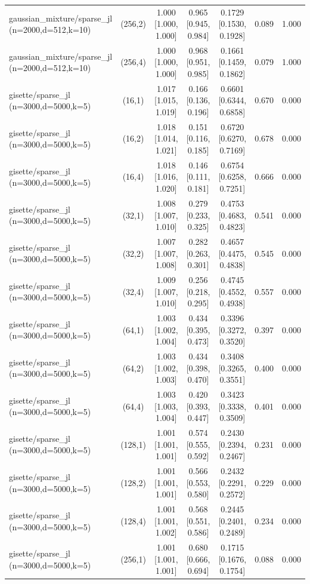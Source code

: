 \begin{tabular}{lcccccc}
gaussian\_mixture/sparse\_jl (n=2000,d=512,k=10) & (256,2) & 1.000 [1.000, 1.000] & 0.965 [0.945, 0.984] & 0.1729 [0.1530, 0.1928] & 0.089 & 1.000 \\
gaussian\_mixture/sparse\_jl (n=2000,d=512,k=10) & (256,4) & 1.000 [1.000, 1.000] & 0.968 [0.951, 0.985] & 0.1661 [0.1459, 0.1862] & 0.079 & 1.000 \\
gisette/sparse\_jl (n=3000,d=5000,k=5) & (16,1) & 1.017 [1.015, 1.019] & 0.166 [0.136, 0.196] & 0.6601 [0.6344, 0.6858] & 0.670 & 0.000 \\
gisette/sparse\_jl (n=3000,d=5000,k=5) & (16,2) & 1.018 [1.014, 1.021] & 0.151 [0.116, 0.185] & 0.6720 [0.6270, 0.7169] & 0.678 & 0.000 \\
gisette/sparse\_jl (n=3000,d=5000,k=5) & (16,4) & 1.018 [1.016, 1.020] & 0.146 [0.111, 0.181] & 0.6754 [0.6258, 0.7251] & 0.666 & 0.000 \\
gisette/sparse\_jl (n=3000,d=5000,k=5) & (32,1) & 1.008 [1.007, 1.010] & 0.279 [0.233, 0.325] & 0.4753 [0.4683, 0.4823] & 0.541 & 0.000 \\
gisette/sparse\_jl (n=3000,d=5000,k=5) & (32,2) & 1.007 [1.007, 1.008] & 0.282 [0.263, 0.301] & 0.4657 [0.4475, 0.4838] & 0.545 & 0.000 \\
gisette/sparse\_jl (n=3000,d=5000,k=5) & (32,4) & 1.009 [1.007, 1.010] & 0.256 [0.218, 0.295] & 0.4745 [0.4552, 0.4938] & 0.557 & 0.000 \\
gisette/sparse\_jl (n=3000,d=5000,k=5) & (64,1) & 1.003 [1.002, 1.004] & 0.434 [0.395, 0.473] & 0.3396 [0.3272, 0.3520] & 0.397 & 0.000 \\
gisette/sparse\_jl (n=3000,d=5000,k=5) & (64,2) & 1.003 [1.002, 1.003] & 0.434 [0.398, 0.470] & 0.3408 [0.3265, 0.3551] & 0.400 & 0.000 \\
gisette/sparse\_jl (n=3000,d=5000,k=5) & (64,4) & 1.003 [1.003, 1.004] & 0.420 [0.393, 0.447] & 0.3423 [0.3338, 0.3509] & 0.401 & 0.000 \\
gisette/sparse\_jl (n=3000,d=5000,k=5) & (128,1) & 1.001 [1.001, 1.001] & 0.574 [0.555, 0.592] & 0.2430 [0.2394, 0.2467] & 0.231 & 0.000 \\
gisette/sparse\_jl (n=3000,d=5000,k=5) & (128,2) & 1.001 [1.001, 1.001] & 0.566 [0.553, 0.580] & 0.2432 [0.2291, 0.2572] & 0.229 & 0.000 \\
gisette/sparse\_jl (n=3000,d=5000,k=5) & (128,4) & 1.001 [1.001, 1.002] & 0.568 [0.551, 0.586] & 0.2445 [0.2401, 0.2489] & 0.234 & 0.000 \\
gisette/sparse\_jl (n=3000,d=5000,k=5) & (256,1) & 1.001 [1.001, 1.001] & 0.680 [0.666, 0.694] & 0.1715 [0.1676, 0.1754] & 0.088 & 0.000 \\

\end{tabular}
